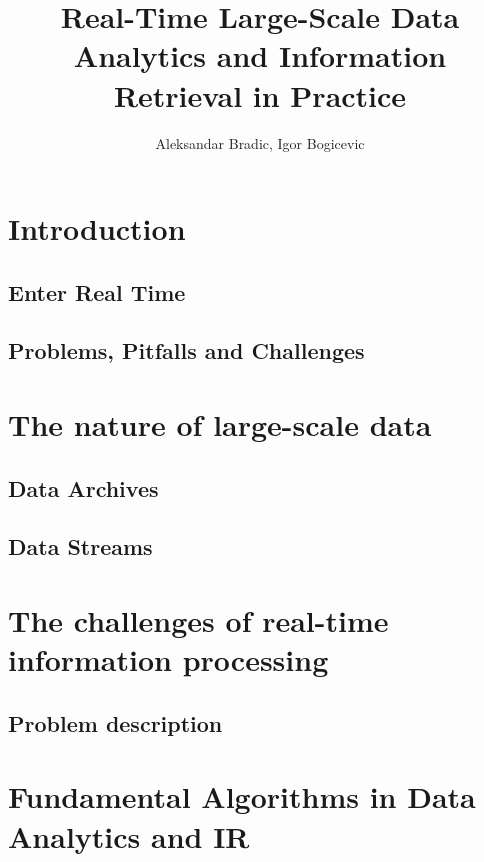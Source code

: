 \documentclass[]{book}    %
\begin{document}
\author{Aleksandar Bradic, Igor Bogicevic}
\title{Real-Time Large-Scale Data Analytics and Information Retrieval in Practice}

\maketitle 

  \frontmatter 
  \tableofcontents 


\mainmatter 

\chapter{Introduction}
\label{altrings} %

\section{Enter Real Time}
\section{Problems, Pitfalls and Challenges}

\chapter{The nature of large-scale data}
\section{Data Archives}
\section{Data Streams}

\chapter{The challenges of real-time information processing}
\section{Problem description}

\chapter{Fundamental Algorithms in Data Analytics and IR}
\end{document}
